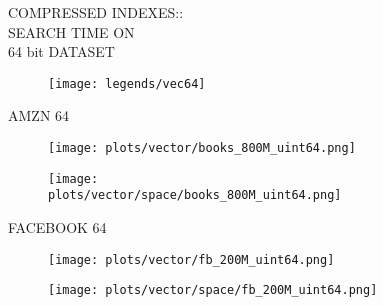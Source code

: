 \documentclass{article}
\begin{document}
\begin{figure}[!htbp]
\fbox
{
\begin{minipage}[t][0.98\textheight][t]{\textwidth}
\centering
\vspace*{-0.2cm}
    \begin{minipage}{0.23\linewidth}
    \footnotesize{COMPRESSED INDEXES::\\SEARCH TIME ON \\ 64 bit DATASET}
    \end{minipage}
   \begin{minipage}{0.75\linewidth}
        \begin{figure}[H]
        \texttt{[image: legends/vec64]}
        \end{figure}
    \end{minipage}
    \vspace*{-10px}

    \begin{minipage}{0.03\linewidth}
    \begin{sideways}\small AMZN 64 \end{sideways}
    \end{minipage}
    \begin{minipage}{0.3\linewidth}
        \begin{figure}[H]
        \texttt{[image: plots/vector/books\_800M\_uint64.png]}
        \end{figure}
    \end{minipage}
    \begin{minipage}{0.3\linewidth}
        \begin{figure}[H]
            \texttt{[image: plots/vector/space/books\_800M\_uint64.png]}
        \end{figure}
    \end{minipage}
    \vspace*{-20px}

    \begin{minipage}{0.03\linewidth}
    \begin{sideways}\small FACEBOOK 64\end{sideways}
    \end{minipage}
    \begin{minipage}{0.3\linewidth}
        \begin{figure}[H]
        \texttt{[image: plots/vector/fb\_200M\_uint64.png]}
        \end{figure}
    \end{minipage}
    \begin{minipage}{0.3\linewidth}
        \begin{figure}[H]
            \texttt{[image: plots/vector/space/fb\_200M\_uint64.png]}
        \end{figure}
    \end{minipage}
    \vspace*{-20px}


\end{minipage}}
\end{figure}
\end{document}
